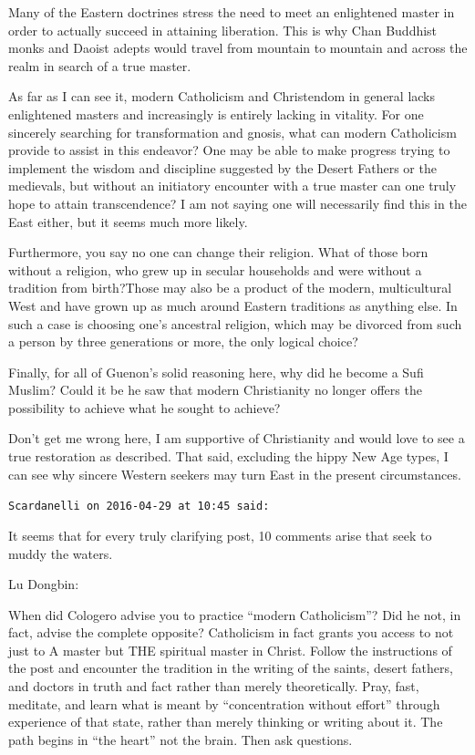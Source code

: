 \begin{footnotesize}
\begin{sffamily}
Many of the Eastern doctrines stress the need to meet an enlightened master in order to actually succeed in attaining liberation. This is why Chan Buddhist monks and Daoist adepts would travel from mountain to mountain and across the realm in search of a true master.

As far as I can see it, modern Catholicism and Christendom in general lacks enlightened masters and increasingly is entirely lacking in vitality. For one sincerely searching for transformation and gnosis, what can modern Catholicism provide to assist in this endeavor? One may be able to make progress trying to implement the wisdom and discipline suggested by the Desert Fathers or the medievals, but without an initiatory encounter with a true master can one truly hope to attain transcendence? I am not saying one will necessarily find this in the East either, but it seems much more likely.

Furthermore, you say no one can change their religion. What of those born without a religion, who grew up in secular households and were without a tradition from birth?Those may also be a product of the modern, multicultural West and have grown up as much around Eastern traditions as anything else. In such a case is choosing one's ancestral religion, which may be divorced from such a person by three generations or more, the only logical choice?

Finally, for all of Guenon's solid reasoning here, why did he become a Sufi Muslim? Could it be he saw that modern Christianity no longer offers the possibility to achieve what he sought to achieve?

Don't get me wrong here, I am supportive of Christianity and would love to see a true restoration as described. That said, excluding the hippy New Age types, I can see why sincere Western seekers may turn East in the present circumstances.

\hfill

\texttt{Scardanelli on 2016-04-29 at 10:45 said:}

It seems that for every truly clarifying post, 10 comments arise that seek to muddy the waters.

Lu Dongbin:

When did Cologero advise you to practice ``modern Catholicism''? Did he not, in fact, advise the complete opposite? Catholicism in fact grants you access to not just to A master but THE spiritual master in Christ. Follow the instructions of the post and encounter the tradition in the writing of the saints, desert fathers, and doctors in truth and fact rather than merely theoretically. Pray, fast, meditate, and learn what is meant by ``concentration without effort'' through experience of that state, rather than merely thinking or writing about it. The path begins in ``the heart'' not the brain. Then ask questions.


\end{sffamily}
\end{footnotesize}
